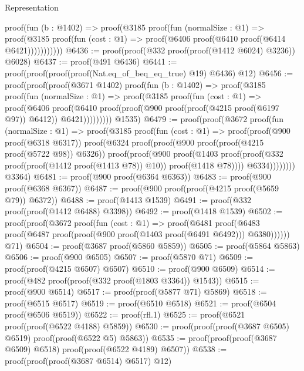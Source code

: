 \begin{lexlean}{Representation}
\begin{coremodule}
            proof(fun (b : @1402) =>
              proof(@3185
                  proof(fun (normalSize : @1) =>
                    proof(@3185
                        proof(fun (cost : @1) =>
                          proof(@6406 proof(@6410 proof(@6414 @6421)))))))))))
@6436 := proof(proof(@332 proof(proof(@1412 @6024) @3236)) @6028)
@6437 := proof(@491 @6436)
@6441 := proof(proof(proof(proof(Nat.eq_of_beq_eq_true) @19) @6436) @12)
@6456 := proof(proof(proof(@3671 @1402)
        proof(fun (b : @1402) =>
          proof(@3185
              proof(fun (normalSize : @1) =>
                proof(@3185
                    proof(fun (cost : @1) =>
                      proof(@6406
                          proof(@6410
                              proof(proof(@900 proof(proof(@4215 proof(@6197 @97)) @6412))
                                  @6421)))))))))
      @1535)
@6479 := proof(proof(@3672
        proof(fun (normalSize : @1) =>
          proof(@3185
              proof(fun (cost : @1) =>
                proof(proof(@900 proof(@6318 @6317))
                    proof(@6324
                        proof(proof(@900 proof(proof(@4215 proof(@5722 @98)) @6326))
                            proof(proof(@900
                                  proof(@1403
                                      proof(proof(@332 proof(proof(@1412 proof(@1413 @78)) @10))
                                          proof(@1418 @78))))
                                @6334))))))))
      @3364)
@6481 := proof(@900 proof(@6364 @6363))
@6483 := proof(@900 proof(@6368 @6367))
@6487 := proof(@900 proof(proof(@4215 proof(@5659 @79)) @6372))
@6488 := proof(@1413 @1539)
@6491 := proof(@332 proof(proof(@1412 @6488) @3398))
@6492 := proof(@1418 @1539)
@6502 := proof(proof(@3672
        proof(fun (cost : @1) =>
          proof(@6481
              proof(@6483 proof(@6487 proof(proof(@900 proof(@1403 proof(@6491 @6492))) @6380))))))
      @71)
@6504 := proof(@3687 proof(@5860 @5859))
@6505 := proof(@5864 @5863)
@6506 := proof(@900 @6505)
@6507 := proof(@5870 @71)
@6509 := proof(proof(@4215 @6507) @6507)
@6510 := proof(@900 @6509)
@6514 := proof(@482 proof(proof(@332 proof(@1803 @3364)) @1543))
@6515 := proof(@900 @6514)
@6517 := proof(proof(@5877 @71) @5869)
@6518 := proof(@6515 @6517)
@6519 := proof(@6510 @6518)
@6521 := proof(@6504 proof(@6506 @6519))
@6522 := proof(rfl.{1})
@6525 := proof(@6521 proof(proof(@6522 @4188) @5859))
@6530 := proof(proof(proof(@3687 @6505) @6519) proof(proof(@6522 @5) @5863))
@6535 := proof(proof(proof(@3687 @6509) @6518) proof(proof(@6522 @4189) @6507))
@6538 := proof(proof(proof(@3687 @6514) @6517) @12)

\end{coremodule}
\end{lexlean}
